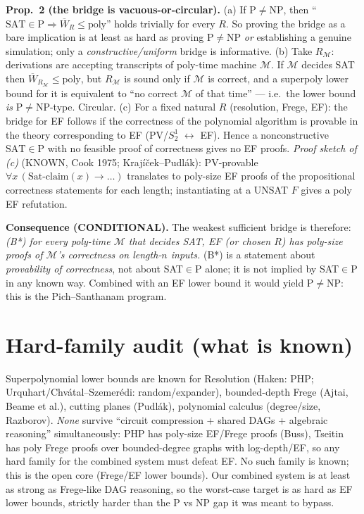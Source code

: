 \documentclass{article}
\begin{document}
\textbf{Prop.\ 2 (the bridge is vacuous-or-circular).}
(a) If $\mathrm P\ne\mathrm{NP}$, then ``$\mathrm{SAT}\in\mathrm P\Rightarrow\overline W_R\le\mathrm{poly}$'' holds trivially for every $R$. So proving the bridge as a bare implication is at least as hard as proving $\mathrm P\ne\mathrm{NP}$ \emph{or} establishing a genuine simulation; only a \emph{constructive/uniform} bridge is informative.
(b) Take $R_{\mathcal M}$: derivations are accepting transcripts of poly-time machine $\mathcal M$. If $\mathcal M$ decides SAT then $\overline W_{R_{\mathcal M}}\le\mathrm{poly}$, but $R_{\mathcal M}$ is sound only if $\mathcal M$ is correct, and a superpoly lower bound for it is equivalent to ``no correct $\mathcal M$ of that time'' --- i.e.\ the lower bound \emph{is} P$\ne$NP-type. Circular.
(c) For a fixed natural $R$ (resolution, Frege, EF): the bridge for EF follows if the correctness of the polynomial algorithm is provable in the theory corresponding to EF (PV/$S^1_2$ $\leftrightarrow$ EF). Hence a nonconstructive $\mathrm{SAT}\in\mathrm P$ with no feasible proof of correctness gives no EF proofs.
\textit{Proof sketch of (c)} (KNOWN, Cook 1975; Krajíček--Pudlák): PV-provable $\forall x\,(\mathrm{Sat}\text{-claim}(x)\to\ldots)$ translates to poly-size EF proofs of the propositional correctness statements for each length; instantiating at a UNSAT $F$ gives a poly EF refutation.

\textbf{Consequence (CONDITIONAL).} The weakest sufficient bridge is therefore: \emph{(B*) for every poly-time $\mathcal M$ that decides SAT, EF (or chosen $R$) has poly-size proofs of $\mathcal M$'s correctness on length-$n$ inputs.} (B*) is a statement about \emph{provability of correctness}, not about SAT$\in$P alone; it is not implied by SAT$\in$P in any known way. Combined with an EF lower bound it would yield P$\ne$NP: this is the Pich--Santhanam program.

\section{Hard-family audit (what is known)}
Superpolynomial lower bounds are known for Resolution (Haken: PHP; Urquhart/Chv\'atal--Szemer\'edi: random/expander), bounded-depth Frege (Ajtai, Beame et al.), cutting planes (Pudl\'ak), polynomial calculus (degree/size, Razborov). \emph{None} survive ``circuit compression + shared DAGs + algebraic reasoning'' simultaneously: PHP has poly-size EF/Frege proofs (Buss), Tseitin has poly Frege proofs over bounded-degree graphs with log-depth/EF, so any hard family for the combined system must defeat EF. No such family is known; this is the open core (Frege/EF lower bounds). Our combined system is at least as strong as Frege-like DAG reasoning, so the worst-case target is as hard as EF lower bounds, strictly harder than the P vs NP gap it was meant to bypass.
\end{document}
